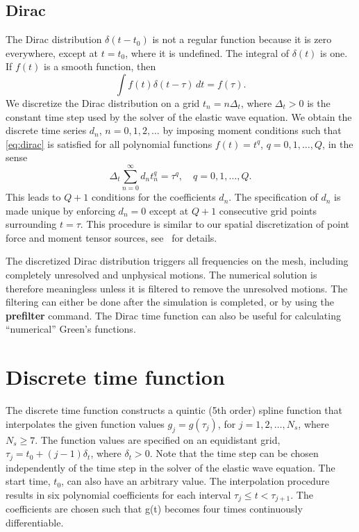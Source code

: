 \documentclass[11pt]{report}
\begin{document}
\subsection{Dirac}
The Dirac distribution $\delta(t-t_0)$ is not a regular function because it is zero everywhere,
except at $t=t_0$, where it is undefined. The integral of $\delta(t)$ is one. If $f(t)$ is a smooth
function, then
\begin{equation}\label{eq:dirac}
\int f(t)\delta(t-\tau)\, dt = f(\tau).
\end{equation}
We discretize the Dirac distribution on a grid $t_n = n\Delta_t$, where $\Delta_t>0$ is the constant
time step used by the solver of the elastic wave equation. We obtain the discrete time series $d_n$,
$n=0,1,2,\ldots$ by imposing moment conditions such that \eqref{eq:dirac} is satisfied for all
polynomial functions $f(t)=t^q$, $q=0,1,\ldots,Q$, in the sense
\[
\Delta_t \sum_{n=0}^\infty d_n t_n^q = \tau^q,\quad q=0,1,\ldots,Q. 
\]
This leads to $Q+1$ conditions for the coefficients $d_n$. The specification of $d_n$ is made unique
by enforcing $d_n=0$ except at $Q+1$ consecutive grid points surrounding $t=\tau$. This procedure is
similar to our spatial discretization of point force and moment tensor sources, see~\cite{PetSjo-10}
for details.

The discretized Dirac distribution triggers all frequencies on the mesh, including completely
unresolved and unphysical motions. The numerical solution is therefore meaningless unless it is
filtered to remove the unresolved motions. The filtering can either be done after the simulation is
completed, or by using the {\bf prefilter} command. The Dirac time function can also be useful for
calculating ``numerical'' Green's functions.

\section{Discrete time function}

The discrete time function constructs a quintic (5th order) spline function that interpolates the
given function values $g_j = g(\tau_j)$, for $j=1,2,\ldots, N_s$, where $N_s\geq 7$. The function
values are specified on an equidistant grid, $\tau_j = t_0 + (j-1) \delta_t$, where
$\delta_t>0$. Note that the time step can be chosen independently of the time step in the solver of
the elastic wave equation. The start time, $t_0$, can also have an arbitrary value. The
interpolation procedure results in six polynomial coefficients for each interval $\tau_j\leq t
<\tau_{j+1}$. The coefficients are chosen such that g(t) becomes four times continuously
differentiable.
\end{document}
